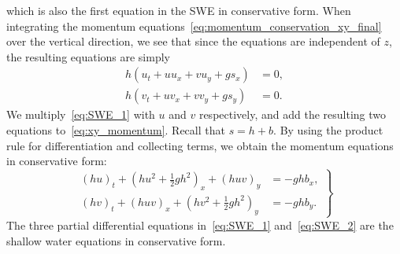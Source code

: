 which is also the first equation in the SWE in conservative form.
When integrating the momentum equations~\eqref{eq:momentum_conservation_xy_final} over the vertical direction, we see that since the equations are independent of $z$, the resulting equations are simply
\begin{equation}\label{eq:xy_momentum}
    \begin{aligned}
        h(u_t + uu_x + vu_y + g s_x) &= 0,\\
        h(v_t + uv_x + vv_y + g s_y) &= 0.
    \end{aligned}
\end{equation}
We multiply~\eqref{eq:SWE_1} with $u$ and $v$ respectively, and add the resulting two equations to~\eqref{eq:xy_momentum}.
Recall that $s = h + b$. 
By using the product rule for differentiation and collecting terms, we obtain the momentum equations in conservative form:
\begin{equation}\label{eq:SWE_2}
    \left.
    \begin{aligned}
        {(hu)}_t + {(hu^2 + \frac{1}{2}gh^2)}_x + {(huv)}_y &= -gh b_x,\\
        {(hv)}_t + {(huv)}_x + {(hv^2 + \frac{1}{2}gh^2)}_y &= -gh b_y.
    \end{aligned}
    \right\}
\end{equation}
The three partial differential equations in~\eqref{eq:SWE_1} and~\eqref{eq:SWE_2} are the shallow water equations in conservative form.


